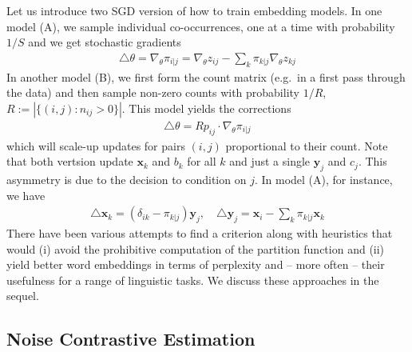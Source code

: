 \documentclass{article}
\newcommand{\x}{{\mathbf x}}
\newcommand{\y}{{\mathbf y}}
\begin{document}
Let us introduce two SGD version of how to train embedding models. In one model (A), we sample individual co-occurrences, one at a time with probability $1/S$ and we get stochastic gradients
\begin{align}
\triangle \theta = \nabla_\theta \pi_{i|j} = \nabla_\theta z_{ij} - \sum_{k} \pi_{k|j} \nabla_\theta z_{kj} 
\end{align}
In another model (B), we first form the count matrix (e.g.~in a first pass through the data) and then sample non-zero counts with probability $1/R$, $R:=|\{ (i,j): n_{ij}>0\}|$. This model yields the corrections
\begin{align}
\triangle \theta = R p_{ij}  \cdot \nabla_\theta \pi_{i|j}
\end{align}
which will scale-up updates for pairs $(i,j)$ proportional to their count. Note that both vertsion update $\x_k$ and $b_k$ for all $k$ and just a single $\y_j$ and $c_j$. This asymmetry is due to the decision to condition on $j$. In model (A), for instance, we have
\begin{align}
\triangle \x_k = \left( \delta_{ik} - \pi_{k|j} \right) \y_j, \quad 
\triangle \y_j = \x_i -\sum_{k} \pi_{k|j} \x_k
\end{align} 
There have been various attempts to find a criterion along with heuristics that would (i) avoid the prohibitive computation of the partition function and (ii) yield better word embeddings in terms of perplexity and -- more often -- their usefulness for a range of linguistic tasks. We discuss these approaches in the sequel.

\subsection{Noise Contrastive Estimation} 
\end{document}

